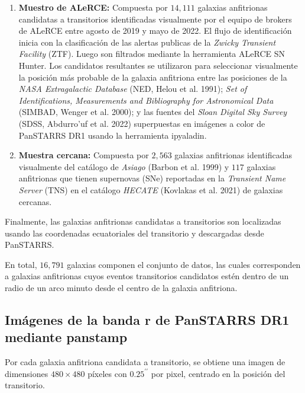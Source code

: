 \documentclass[../tesis.tex]{subfiles}
\begin{document}
\begin{enumerate}
    \item \textbf{Muestro de ALeRCE:} Compuesta por $14,111$ galaxias anfitrionas candidatas a transitorios identificadas visualmente por el equipo de brokers de ALeRCE entre agosto de 2019 y mayo de 2022. El flujo de identificación inicia con la clasificación de las alertas publicas de la \textit{Zwicky Transient Facility} (ZTF). Luego son filtrados mediante la herramienta ALeRCE SN Hunter. Los candidatos resultantes se utilizaron para seleccionar visualmente la posición más probable de la galaxia anfitriona entre las posiciones de la \textit{NASA Extragalactic Database} (NED, Helou et al. 1991); \textit{Set of Identifications, Measurements and Bibliography for Astronomical Data} (SIMBAD, Wenger et al. 2000); y las fuentes del \textit{Sloan Digital Sky Survey} (SDSS, Abdurro’uf et al. 2022) superpuestas en imágenes a color de PanSTARRS DR1 usando la herramienta ipyaladin.

    \item \textbf{Muestra cercana:} Compuesta por $2,563$ galaxias anfitrionas identificadas visualmente del catálogo de \textit{Asiago} (Barbon et al. 1999) y $117$ galaxias anfitrionas que tienen supernovas (SNe) reportadas en la \textit{Transient Name Server} (TNS) en el catálogo \textit{HECATE} (Kovlakas et al. 2021) de galaxias cercanas.
\end{enumerate}

Finalmente, las galaxias anfitrionas candidatas a transitorios son localizadas usando las coordenadas ecuatoriales del transitorio y descargadas desde PanSTARRS.\par\null\par

En total, $16,791$ galaxias componen el conjunto de datos, las cuales corresponden a galaxias anfitrionas cuyos eventos transitorios candidatos estén dentro de un radio de un arco minuto desde el centro de la galaxia anfitriona.\par\null\par

\subsection{Imágenes de la banda r de PanSTARRS DR1 mediante panstamp} \label{methods:dataset1}
Por cada galaxia anfitriona candidata a transitorio, se obtiene una imagen de dimensiones $480\times480$ píxeles con $0.25^{\prime\prime}$ por pixel, centrado en la posición del transitorio.\par\null\par
\end{document}

